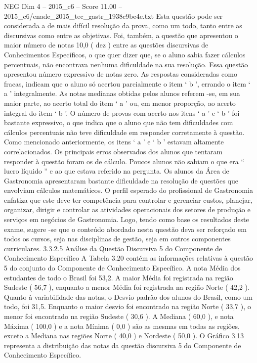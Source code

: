 \begin{textsample}{NEG Dim 4 – 2015\_c6 – Score 11.00 – 2015\_c6/enade\_2015\_tec\_gastr\_1938c9be4e.txt}
Esta questão pode ser considerada a de mais difícil resolução da prova, como um todo, tanto entre as discursivas como entre as objetivas.
Foi, também, a questão que apresentou o maior número de notas 10,0 ( dez ) entre as questões discursivas de Conhecimentos Específicos, o que quer dizer que, se o aluno sabia fazer cálculos percentuais, não encontrava nenhuma dificuldade na sua resolução.
Essa questão apresentou número expressivo de notas zero.
As respostas consideradas como fracas, indicam que o aluno só acertou parcialmente o item ‘ b ’, errando o item ‘ a ’ integralmente.
As notas medianas obtidas pelos alunos referem -se, em sua maior parte, ao acerto total do item ‘ a ’ ou, em menor proporção, ao acerto integral do item ‘ b ’.
O número de provas com acerto nos itens ‘ a ’ e ‘ b ’ foi bastante expressivo, o que indica que o aluno que não tem dificuldades com cálculos percentuais não teve dificuldade em responder corretamente à questão.
Como mencionado anteriormente, os itens ‘ a ’ e ‘ b ’ estavam altamente correlacionados.
Os principais erros observados dos alunos que tentaram responder à questão foram os de cálculo.
Poucos alunos não sabiam o que era “ lucro líquido ” e ao que estava referido na pergunta.
Os alunos da Área de Gastronomia apresentaram bastante dificuldade na resolução de questões que envolviam cálculos matemáticos.
O perfil esperado do profissional de Gastronomia enfatiza que este deve ter competência para controlar e gerenciar custos, planejar, organizar, dirigir e controlar as atividades operacionais dos setores de produção e serviços em negócios de Gastronomia.
Logo, tendo como base os resultados deste exame, sugere -se que o conteúdo abordado nesta questão deva ser reforçado em todos os cursos, seja nas disciplinas de gestão, seja em outros componentes curriculares. 3.3.2.5 Análise da Questão Discursiva 5 do Componente de Conhecimento Específico A Tabela 3.20 contém as informações relativas à questão 5 do conjunto do Componente de Conhecimento Específico.
A nota Média dos estudantes de todo o Brasil foi 53,2.
A maior Média foi registrada na região Sudeste ( 56,7 ), enquanto a menor Média foi registrada na região Norte ( 42,2 ).
Quanto à variabilidade das notas, o Desvio padrão dos alunos do Brasil, como um todo, foi 31,5.
Enquanto o maior desvio foi encontrado na região Norte ( 33,7 ), o menor foi encontrado na região Sudeste ( 30,6 ).
A Mediana ( 60,0 ), e nota Máxima ( 100,0 ) e a nota Mínima ( 0,0 ) são as mesmas em todas as regiões, exceto a Mediana nas regiões Norte ( 40,0 ) e Nordeste ( 50,0 ).
O Gráfico 3.13 representa a distribuição das notas da questão discursiva 5 do Componente de Conhecimento Específico.

\end{textsample}
